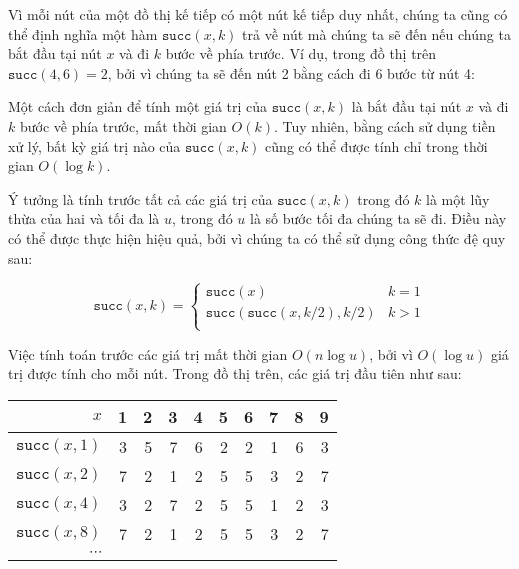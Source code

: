 Vì mỗi nút của một đồ thị kế tiếp có một
nút kế tiếp duy nhất, chúng ta cũng có thể định nghĩa một hàm $\texttt{succ}(x,k)$
trả về nút mà chúng ta sẽ đến nếu
chúng ta bắt đầu tại nút $x$ và đi $k$ bước về phía trước.
Ví dụ, trong đồ thị trên $\texttt{succ}(4,6)=2$,
bởi vì chúng ta sẽ đến nút 2 bằng cách đi 6 bước từ nút 4:

\begin{center}
\end{center}

Một cách đơn giản để tính một giá trị của $\texttt{succ}(x,k)$
là bắt đầu tại nút $x$ và đi $k$ bước về phía trước, mất thời gian $O(k)$.
Tuy nhiên, bằng cách sử dụng tiền xử lý, bất kỳ giá trị nào của $\texttt{succ}(x,k)$
cũng có thể được tính chỉ trong thời gian $O(\log k)$.

Ý tưởng là tính trước tất cả các giá trị của $\texttt{succ}(x,k)$ trong đó
$k$ là một lũy thừa của hai và tối đa là $u$, trong đó $u$ là
số bước tối đa chúng ta sẽ đi.
Điều này có thể được thực hiện hiệu quả, bởi vì
chúng ta có thể sử dụng công thức đệ quy sau:

\begin{equation*}
    \texttt{succ}(x,k) = \begin{cases}
               \texttt{succ}(x)              & k = 1\\
               \texttt{succ}(\texttt{succ}(x,k/2),k/2)   & k > 1\\
           \end{cases}
\end{equation*}

Việc tính toán trước các giá trị mất thời gian $O(n \log u)$,
bởi vì $O(\log u)$ giá trị được tính cho mỗi nút.
Trong đồ thị trên, các giá trị đầu tiên như sau:

\begin{center}
\begin{tabular}{r|rrrrrrrrr}
$x$ & 1 & 2 & 3 & 4 & 5 & 6 & 7 & 8 & 9 \\
\hline
$\texttt{succ}(x,1)$ & 3 & 5 & 7 & 6 & 2 & 2 & 1 & 6 & 3 \\
$\texttt{succ}(x,2)$ & 7 & 2 & 1 & 2 & 5 & 5 & 3 & 2 & 7 \\
$\texttt{succ}(x,4)$ & 3 & 2 & 7 & 2 & 5 & 5 & 1 & 2 & 3 \\
$\texttt{succ}(x,8)$ & 7 & 2 & 1 & 2 & 5 & 5 & 3 & 2 & 7 \\
$\cdots$ \\
\end{tabular}
\end{center}

